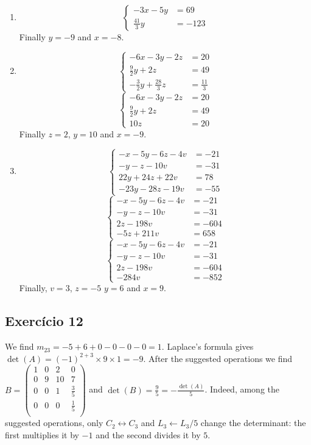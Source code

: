 \begin{enumerate}
\item $$\left\{\begin{aligned}-3x-5y&=69\\\frac{41}{3}y&=-123\end{aligned}\right.$$
  Finally $y=-9$ and $x=-8$.
\item $$\left\{\begin{aligned}-6x-3y-2z&=20\\\frac{9}{2}y+2z&=49\\-\frac{3}{2}y+\frac{28}{3}z&=\frac{11}{3}\end{aligned}\right.$$
  $$\left\{\begin{aligned}-6x-3y-2z&=20\\\frac{9}{2}y+2z&=49\\10z&=20\end{aligned}\right.$$
  Finally $z=2$, $y=10$ and $x=-9$.
\item
  $$\left\{\begin{aligned}-x-5y-6z-4v&=-21\\-y-z-10v&=-31\\22y+24z+22v&=78\\-23y-28z-19v&=-55\end{aligned}\right.$$
  $$\left\{\begin{aligned}-x-5y-6z-4v&=-21\\-y-z-10v&=-31\\2z-198v&=-604\\-5z+211v&=658\end{aligned}\right.$$
  $$\left\{\begin{aligned}-x-5y-6z-4v&=-21\\-y-z-10v&=-31\\2z-198v&=-604\\-284v&=-852\end{aligned}\right.$$
  Finally, $v=3$, $z=-5$ $y=6$ and $x=9$.
\end{enumerate}

\subsection*{Exercício 12}

We find $m_{23} = -5 + 6 + 0 - 0 - 0 - 0 = 1$. Laplace's formula gives
$\det{(A)} = {(-1)}^{2+3} \times 9 \times 1 = -9$. After the suggested
operations we find
$B = \begin{pmatrix}
          1 & 0 & 2 & 0   \\
          0 & 9 & 10 & 7 \\
          0 & 0 & 1 & \frac{3}{5}   \\
          0 & 0 & 0 & \frac{1}{5}  \\
      \end{pmatrix}$
and $\det{(B)} = \frac{9}{5} = -\frac{\det{(A)}}{5}$.
Indeed, among the suggested
operations, only $C_2 \leftrightarrow C_3$ and $L_3 \leftarrow L_3 / 5$
change the determinant: the first multiplies it by $-1$ and the second divides
it by $5$.

